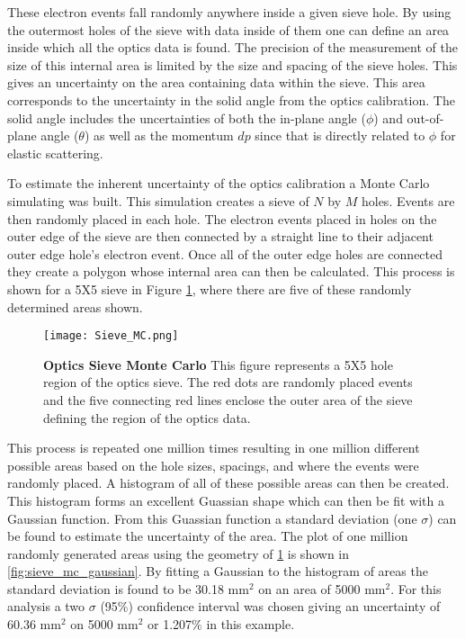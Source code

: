 These electron events fall randomly anywhere inside a given sieve hole. By using the outermost holes of the sieve with data inside of them one can define an area inside which all the optics data is found. The precision of the measurement of the size of this internal area is limited by the size and spacing of the sieve holes. This gives an uncertainty on the area containing data within the sieve. This area corresponds to the uncertainty in the solid angle from the optics calibration. The solid angle includes the uncertainties of both the in-plane angle ($\phi$) and out-of-plane angle ($\theta$) as well as the momentum $dp$ since that is directly related to $\phi$ for elastic scattering.  

To estimate the inherent uncertainty of the optics calibration a Monte Carlo simulating was built. This simulation creates a sieve of $N$ by $M$ holes. Events are then randomly placed in each hole. The electron events placed in holes on the outer edge of the sieve are then connected by a straight line to their adjacent outer edge hole's electron event. Once all of the outer edge holes are connected they create a polygon whose internal area can then be calculated. This process is shown for a 5X5 sieve in Figure \ref{fig:sieve_mc}, where there are five of these randomly determined areas shown. 

\begin{figure}[!ht]
\begin{center}
\texttt{[image: Sieve\_MC.png]}
\end{center}
\caption[Optics Sieve Monte Carlo]{
{\bf{Optics Sieve Monte Carlo}} This figure represents a 5X5 hole region of the optics sieve. The red dots are randomly placed events and the five connecting red lines enclose the outer area of the sieve defining the region of the optics data.}
\label{fig:sieve_mc}
\end{figure}

This process is repeated one million times resulting in one million different possible areas based on the hole sizes, spacings, and where the events were randomly placed. A histogram of all of these possible areas can then be created. This histogram forms an excellent Guassian shape which can then be fit with a Gaussian function. From this Guassian function a standard deviation (one $\sigma$) can be found to estimate the uncertainty of the area. The plot of one million randomly generated areas using the geometry of \ref{fig:sieve_mc} is shown in \ref{fig:sieve_mc_gaussian}. By fitting a Gaussian to the histogram of areas the standard deviation is found to be 30.18 mm$^2$ on an area of 5000 mm$^2$. For this analysis a two $\sigma$ (95$\%$) confidence interval was chosen giving an uncertainty of 60.36 mm$^2$ on 5000 mm$^2$ or 1.207$\%$ in this example. 

